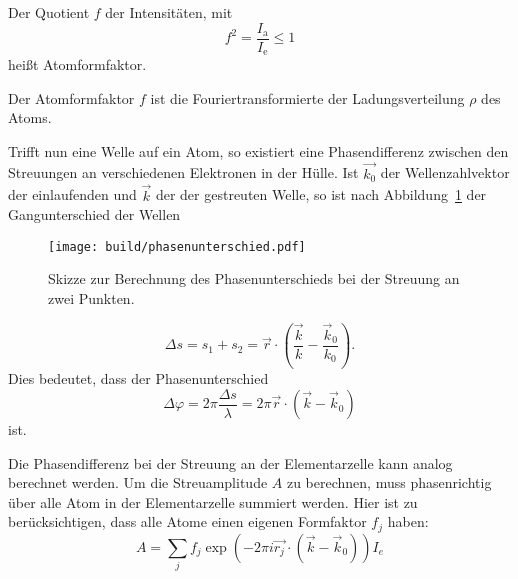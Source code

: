 Der Quotient $f$ der Intensitäten, mit
\begin{equation}
  f^2 = \frac{I_\text{a}}{I_\text{e}} \le 1
\end{equation}
heißt Atomformfaktor.

Der Atomformfaktor $f$ ist die Fouriertransformierte der Ladungsverteilung $\rho$ des Atoms.

Trifft nun eine Welle auf ein Atom, so existiert eine Phasendifferenz zwischen
den Streuungen an verschiedenen Elektronen in der Hülle.
Ist $\vec{k_0}$ der Wellenzahlvektor der einlaufenden und $\vec{k}$ der der gestreuten Welle,
so ist nach Abbildung~\ref{fig:phasenunterschied} der Gangunterschied der Wellen
\begin{figure}
  \centering
  \texttt{[image: build/phasenunterschied.pdf]}
  \caption{Skizze zur Berechnung des Phasenunterschieds bei der Streuung an zwei Punkten.\cite{anleitung}}%
  \label{fig:phasenunterschied}
\end{figure}
\begin{equation}
  \Delta s = s_1 + s_2 = \vec{r} \cdot \left(\frac{\vec{k}}{k} - \frac{\vec{k}_0}{k_0}\right).
\end{equation}
Dies bedeutet, dass der Phasenunterschied
\begin{equation}
  \Delta \varphi = 2 \pi \frac{\Delta s}{\lambda} = 2 \pi \vec{r} \cdot \left(\vec{k} - \vec{k}_0\right)
\end{equation}
ist.


Die Phasendifferenz bei der Streuung an der Elementarzelle kann analog berechnet werden.
Um die Streuamplitude $A$ zu berechnen, muss phasenrichtig über alle Atom
in der Elementarzelle summiert werden.
Hier ist zu berücksichtigen, dass alle Atome einen eigenen Formfaktor $f_j$ haben:
\begin{equation}
  A = \sum_j f_j \exp\left(-2\pi i \vec{r_j} \cdot\left(\vec{k} - \vec{k}_0 \right)\right) I_e
\end{equation}

